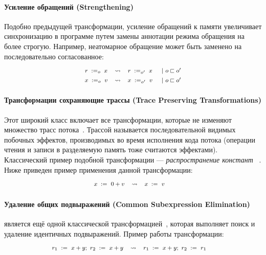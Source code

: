 \paragraph{
Усиление обращений
(Strengthening)
}

Подобно предыдущей трансформации, 
усиление обращений к памяти 
увеличивает синхронизацию в программе 
путем замены аннотации режима обращения на более строгую.
Например, неатомарное обращение может быть заменено на 
последовательно согласованное: 
%
\[\def\arraystretch{1.4}\footnotesize
  \begin{array}{cccl} 

      \readInst{o}{r}{x} 
    & \leadsto 
    & \readInst{o'}{r}{x}
    & ~|~ o \sqsubset o' \\ 

      \writeInst{o}{x}{v}
    & \leadsto 
    & \writeInst{o'}{x}{v}
    & ~|~ o \sqsubset o'  \\ 

  \end{array}
\]

\paragraph{
Трансформации сохраняющие трассы
(Trace Preserving Transformations)
}

Этот широкий класс включает все трансформации, 
которые не изменяют множество трасс потока~\cite{Sevcik-Aspinall:ECOOP08}.
Трассой называется последовательной видимых побочных эффектов,
производимых во время исполнения кода потока 
(операции чтения и записи в разделяемую память тоже считаются эффектами).
Классический пример подобной трансформации --- 
\emph{распространение констант}%
~\cite{Muchnick:ACDI97, Wegman-Zadeck:TOPLAS91}.
Ниже приведен пример применения данной трансформации: 
%
\[\def\arraystretch{1.4}\footnotesize
  \begin{array}{cccl} 

      \writeInst{}{x}{0 + v} 
    & \leadsto 
    & \writeInst{}{x}{v}
    & \\ 

  \end{array}
\]
  
\paragraph{
Удаление общих подвыражений
(Common Subexpression Elimination)
}

\CSE является ещё одной классической трансформацией~\cite{Muchnick:ACDI97}, 
которая выполняет поиск и удаление идентичных подвыражений.
Пример работы трансформации:
%
\[\def\arraystretch{1.4}\footnotesize
  \begin{array}{cccl} 

      \readInst{}{r_1}{x + y} \seq \readInst{}{r_2}{x + y} 
    & \leadsto 
    & \readInst{}{r_1}{x + y} \seq \readInst{}{r_2}{r_1}
    & \\ 

  \end{array}
\]

